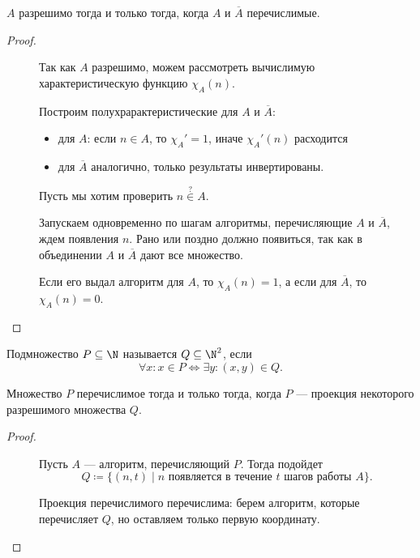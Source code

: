 \begin{thm}
    $ A$ разрешимо тогда и только тогда, когда $ A$ и $ \overline{A}$ перечислимые.
\end{thm}
\begin{proof}
    ~\begin{description}
		\item[] 
			Так как $ A $ разрешимо, можем рассмотреть вычислимую характеристическую функцию $ \chi_{A}(n)$.

			Построим полухрарактеристические для $ A$ и $ \overline{A}$:
			\begin{itemize}
			\item для $ A$: если $ n \in A$, то $ \chi_{A}' = 1$, иначе $ \chi_{A}'(n)$ расходится
			\item для $ \overline{A}$ аналогично, только результаты инвертированы.
			\end{itemize}
		\item[]
	    Пусть мы хотим проверить $ n \stackrel{?}{\in} A$.

	    Запускаем одновременно по шагам алгоритмы, перечисляющие $ A$ и $ \overline{A}$, ждем появления $ n$. 
	    Рано или поздно должно появиться, так как в объединении $ A$ и $\overline{A}$ дают все множество. 
	    
	    Если его выдал алгоритм для $ A$, то $ \chi_A(n) = 1$, а если для $\overline{A}$, то $ \chi_A(n) = 0$.
    \end{description} 
\end{proof}


\begin{defn}[Проекция]
	Подмножество $ P \subseteq \N$ называется  $ Q \subseteq \N^2$, если   \[
		\forall x \colon x \in  P \Longleftrightarrow \exists y \colon  (x, y) \in  Q
	.\] 
\end{defn}

\begin{thm}[О проекции]
    Множество $ P$ перечислимое тогда и только тогда, когда $ P$ --- проекция некоторого разрешимого множества $ Q$.
\end{thm}
\begin{proof}
    ~\begin{description}
		\item[] 
			Пусть $ A$ --- алгоритм, перечисляющий $ P$. Тогда подойдет
			\[
				Q \coloneqq \{(n, t) \mid n \text{ появляется в течение } t \text{ шагов работы } A\}
			.\] 
		\item[] 
			Проекция перечислимого перечислима: берем алгоритм, которые перечисляет $ Q$, но оставляем только первую координату.
    \end{description} 
\end{proof}

